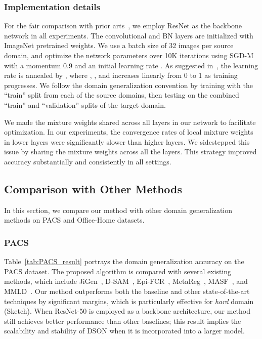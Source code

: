\documentclass[runningheads]{llncs}
\begin{document}
\subsubsection{Implementation details}
For the fair comparison with prior arts~\cite{balaji2018metareg,dinnocente2018domain,li2017domain,li2019episodic}, we employ ResNet as the backbone network in all experiments. 
The convolutional and BN layers are initialized with ImageNet pretrained weights. 
We use a batch size of 32 images per source domain, and optimize the network parameters over 10K iterations using SGD-M with a momentum 0.9 and an initial learning rate . 
As suggested in~\cite{zhao2018adversarial}, the learning rate is annealed by , where , , and  increases linearly from 0 to 1 as training progresses. We follow the domain generalization convention by training with the ``train'' split from each of the source domains, then testing on the combined ``train'' and ``validation'' splits of the target domain. 


We made the mixture weights shared across all layers in our network to facilitate optimization.
In our experiments, the convergence rates of local mixture weights in lower layers were significantly slower than higher layers.
We sidestepped this issue by sharing the mixture weights across all the layers.
This strategy improved accuracy substantially and consistently in all settings.

\subsection{Comparison with Other Methods}

In this section, we compare our method with other domain generalization methods on PACS and Office-Home datasets.

\subsubsection{PACS}
Table~\ref{tab:PACS_result} portrays the domain generalization accuracy on the PACS dataset. 
The proposed algorithm is compared with several existing methods, which include JiGen~\cite{li2017domain}, D-SAM~\cite{dinnocente2018domain}, Epi-FCR~\cite{li2019episodic}, MetaReg~\cite{balaji2018metareg}, MASF~\cite{dou2019domain}, and MMLD~\cite{matsuura2020domain}.
Our method outperforms both the baseline and other state-of-the-art techniques by significant margins, which is particularly effective for {\it hard} domain (Sketch).
When ResNet-50 is employed as a backbone architecture, our method still achieves better performance than other baselines; this result  implies the scalability and stability of DSON when it is incorporated into a larger model.
\end{document}
